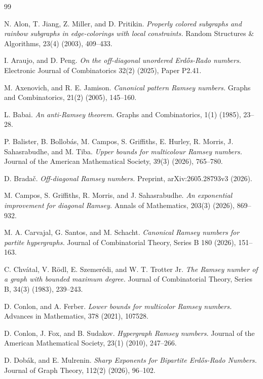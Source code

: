 \documentclass[11pt]{article}
\theoremstyle{plain}
\theoremstyle{definition}
\begin{document}
\begin{thebibliography}{99}

N. Alon, T. Jiang, Z. Miller, and D. Pritikin.
\emph{Properly colored subgraphs and rainbow subgraphs in edge-colorings
with local constraints.}
Random Structures \& Algorithms, 23(4) (2003), 409--433.

I. Araujo, and D. Peng.
\emph{On the off-diagonal unordered Erd{\H{o}}s-Rado numbers.}
Electronic Journal of Combinatorics 32(2) (2025), Paper P2.41.

M. Axenovich, and R. E. Jamison.
\emph{Canonical pattern Ramsey numbers.}
Graphs and Combinatorics, 21(2) (2005), 145--160.

L. Babai.
\emph{An anti-Ramsey theorem.}
Graphs and Combinatorics, 1(1) (1985), 23--28.

P. Balister, B. Bollob{\'a}s, M. Campos, S. Griffiths, E. Hurley, R. Morris, J. Sahasrabudhe, and M. Tiba.
\emph{Upper bounds for multicolour Ramsey numbers.}
Journal of the American Mathematical Society, 39(3) (2026), 765--780.

D. Brada\v{c}.
\emph{Off-diagonal Ramsey numbers.}
Preprint, arXiv:2605.28793v3 (2026).

M. Campos, S. Griffiths, R. Morris, and J. Sahasrabudhe.
\emph{An exponential improvement for diagonal Ramsey.}
Annals of Mathematics, 203(3) (2026), 869--932.

M. A. Carvajal, G. Santos, and M. Schacht.
\emph{Canonical Ramsey numbers for partite hypergraphs.}
Journal of Combinatorial Theory, Series B 180 (2026), 151--163.

C. Chv{\'a}tal, V. R{\"o}dl, E. Szemer{\'e}di, and W. T. Trotter Jr.
\emph{The Ramsey number of a graph with bounded maximum degree.}
Journal of Combinatorial Theory, Series B, 34(3) (1983), 239--243.

D. Conlon, and A. Ferber.
\emph{Lower bounds for multicolor Ramsey numbers.}
Advances in Mathematics, 378 (2021), 107528.

D. Conlon, J. Fox, and B. Sudakov.
\emph{Hypergraph Ramsey numbers.}
Journal of the American Mathematical Society, 23(1) (2010), 247--266.

D. Dob{\'a}k, and E. Mulrenin.
\emph{Sharp Exponents for Bipartite Erd{\H{o}}s-Rado Numbers.}
Journal of Graph Theory, 112(2) (2026), 96--102.


\end{thebibliography}
\end{document}
